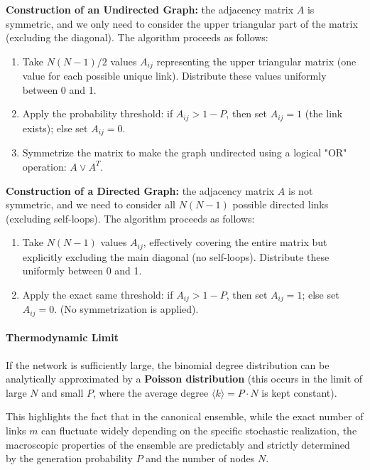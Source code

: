 \textbf{Construction of an Undirected Graph:} the adjacency matrix \( A \) is symmetric, and we only need to consider the upper triangular part of the matrix (excluding the diagonal). The algorithm proceeds as follows:
\begin{enumerate}
    \item Take \( N(N-1)/2 \) values \( A_{ij} \) representing the upper triangular matrix (one value for each possible unique link). Distribute these values uniformly between 0 and 1.
    \item Apply the probability threshold: if \( A_{ij} > 1 - P \), then set \( A_{ij} = 1 \) (the link exists); else set \( A_{ij} = 0 \).
    \item Symmetrize the matrix to make the graph undirected using a logical "OR" operation: \( A \lor A^T \).
\end{enumerate}

\textbf{Construction of a Directed Graph:} the adjacency matrix \( A \) is not symmetric, and we need to consider all \( N(N-1) \) possible directed links (excluding self-loops). The algorithm proceeds as follows:
\begin{enumerate}
    \item Take \( N(N-1) \) values \( A_{ij} \), effectively covering the entire matrix but explicitly excluding the main diagonal (no self-loops). Distribute these uniformly between 0 and 1.
    \item Apply the exact same threshold: if \( A_{ij} > 1 - P \), then set \( A_{ij} = 1 \); else set \( A_{ij} = 0 \). (No symmetrization is applied).
\end{enumerate}

\paragraph{Thermodynamic Limit}
If the network is sufficiently large, the binomial degree distribution can be analytically approximated by a \textbf{Poisson distribution} (this occurs in the limit of large \( N \) and small \( P \), where the average degree \( \langle k \rangle = P \cdot N \) is kept constant).

This highlights the fact that in the canonical ensemble, while the exact number of links \( m \) can fluctuate widely depending on the specific stochastic realization, the macroscopic properties of the ensemble are predictably and strictly determined by the generation probability \( P \) and the number of nodes \( N \).

